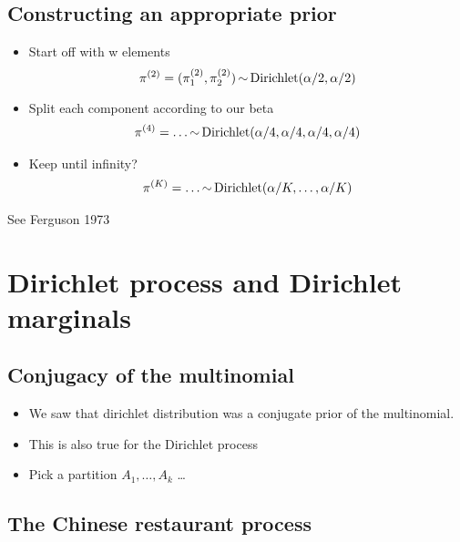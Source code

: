 \subsection{Constructing an appropriate prior}

\begin{itemize}
  \item Start off with w elements
    \begin{equation}
      \pi^{(2)} = (\pi_1^{(2)}, \pi_2^{(2)}) \operatorname*{\sim} \text{Dirichlet}(\alpha/2,
      \alpha/2)
    \end{equation}
  \item Split each component according to our beta
    \begin{align}
      \pi^{(4)} = \dots \operatorname*{\sim} \text{Dirichlet}(\alpha/4,
      \alpha/4,\alpha/4,\alpha/4)
    \end{align}
  \item Keep until infinity?
    \begin{align}
      \pi^{(K)} = \dots \operatorname*{\sim} \text{Dirichlet}(\alpha/K,\dots,\alpha/K)
    \end{align}
\end{itemize}

See Ferguson 1973 \cite{ferguson1973bayesian}

\section{Dirichlet process and Dirichlet marginals}

\subsection{Conjugacy of the multinomial}

\begin{itemize}
  \item We saw that dirichlet distribution was a conjugate prior of the
    multinomial.
  \item This is also true for the Dirichlet process
  \item Pick a partition $A_1,\dots,A_k$ \dots
\end{itemize}

\subsection{The Chinese restaurant process}

